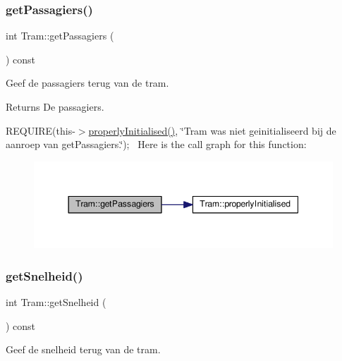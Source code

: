 \subsubsection{\texorpdfstring{get\+Passagiers()}{getPassagiers()}}
{\footnotesize\ttfamily int Tram\+::get\+Passagiers (\begin{DoxyParamCaption}{ }\end{DoxyParamCaption}) const}



Geef de passagiers terug van de tram. 

\begin{DoxyReturn}{Returns}
De passagiers.
\end{DoxyReturn}
R\+E\+Q\+U\+I\+RE(this-\/$>$\hyperlink{class_tram_ac2688f590e4db232b4f535c9bf959efb}{properly\+Initialised()}, \char`\"{}\+Tram was niet geinitialiseerd bij de aanroep van get\+Passagiers.\char`\"{});~\newline
Here is the call graph for this function\+:
\nopagebreak
\begin{figure}[H]
\begin{center}
\leavevmode
\includegraphics[width=344pt]{class_tram_a678ba2cd0c6ab76e966947944f599d56_cgraph}
\end{center}
\end{figure}
\mbox{\label{class_tram_aa8bcd980469801cb8524f170006f666c}} 
\subsubsection{\texorpdfstring{get\+Snelheid()}{getSnelheid()}}
{\footnotesize\ttfamily int Tram\+::get\+Snelheid (\begin{DoxyParamCaption}{ }\end{DoxyParamCaption}) const}



Geef de snelheid terug van de tram. 

